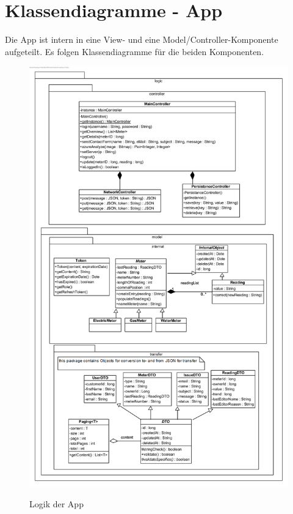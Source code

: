 \section{Klassendiagramme - App}
Die App ist intern in eine View- und eine Model/Controller-Komponente aufgeteilt. Es folgen Klassendiagramme für die beiden Komponenten.
\begin{figure}[H]
\centering
\includegraphics[scale=1.05]{img/diagrams/Android-Class-Diagram-Logic}\\
\caption{Logik der App}
\end{figure}


